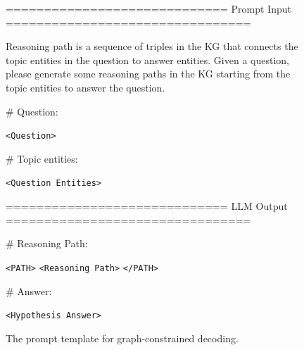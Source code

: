 \begin{figure}[htb]
    \centering
    \begin{minipage}{0.99\columnwidth}
        \centering
        \begin{tcolorbox}[title=Graph-constrained Decoding Prompt]
            \small
            ============================= Prompt Input ================================
    
            Reasoning path is a sequence of triples in the KG that connects the topic entities in the question to answer entities. Given a question, please generate some reasoning paths in the KG starting from the topic entities to answer the question.
    
            \vspace{10pt}

            \# Question: 
            
            \texttt{<Question>}

            \vspace{10pt}

            \# Topic entities:

            \texttt{<Question Entities>}
    
            \vspace{10pt}
            ============================= LLM Output ================================
    
            \# Reasoning Path: 
            
            \texttt{<PATH>} \texttt{<Reasoning Path>} \texttt{</PATH>}

            \vspace{10pt}
    
            \# Answer: 
            
            \texttt{<Hypothesis Answer>}
        \end{tcolorbox}
        \vspace{1mm}
    \end{minipage}
    \caption{The prompt template for graph-constrained decoding.}
    \label{fig:path_gen_prompt}
\end{figure}
